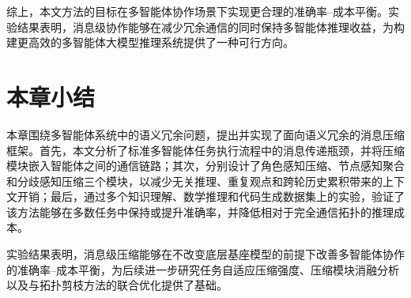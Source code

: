 综上，本文方法的目标在多智能体协作场景下实现更合理的准确率--成本平衡。实验结果表明，消息级协作能够在减少冗余通信的同时保持多智能体推理收益，为构建更高效的多智能体大模型推理系统提供了一种可行方向。

\section{本章小结}

本章围绕多智能体系统中的语义冗余问题，提出并实现了面向语义冗余的消息压缩框架。首先，本文分析了标准多智能体任务执行流程中的消息传递瓶颈，并将压缩模块嵌入智能体之间的通信链路；其次，分别设计了角色感知压缩、节点感知聚合和分歧感知压缩三个模块，以减少无关推理、重复观点和跨轮历史累积带来的上下文开销；最后，通过多个知识理解、数学推理和代码生成数据集上的实验，验证了该方法能够在多数任务中保持或提升准确率，并降低相对于完全通信拓扑的推理成本。

实验结果表明，消息级压缩能够在不改变底层基座模型的前提下改善多智能体协作的准确率--成本平衡，为后续进一步研究任务自适应压缩强度、压缩模块消融分析以及与拓扑剪枝方法的联合优化提供了基础。
